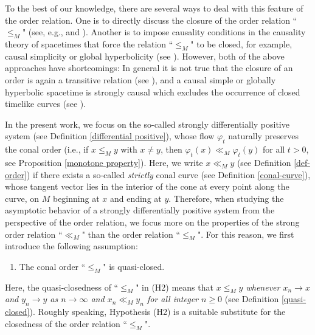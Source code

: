 \documentclass[a4paper,11pt]{article}
\theoremstyle{plain}
\theoremstyle{definition}
\numberwithin{equation}{section}
\begin{document}
To the best of our knowledge, there are several ways to deal with this feature of the order relation. One is to directly discuss the closure of the order relation ``$\leq_M$" (see, e.g., \cite[Section 7]{Lawson89} and \cite{Neeb91}). Another is to impose causality conditions in the causality theory of spacetimes that force the relation ``$\leq_M$" to be closed, for example, causal simplicity or global hyperbolicity (see \cite{Hawkingandellis73, Beemandehrlich81}).
However, both of the above approaches have shortcomings: In general it is not true that the closure of an order is again a transitive relation (see \cite[p.470]{Neeb91}), and 
a causal simple or globally hyperbolic spacetime is strongly causal which excludes the occurrence of closed timelike curves (see \cite[p.73]{Beemandehrlich81}).

In the present work, we focus on the so-called strongly differentially positive system (see Definition \ref{differential positive}), whose flow $\varphi_t$ naturally preserves the conal order (i.e., if $x\leq_M y$ with $x\neq y$, then $\varphi_t(x)\ll_M \varphi_t(y)$ for all $t>0$, see Proposition \ref{monotone property}). Here, we write $x\ll_M y$ (see Definition \ref{def-order}) if there exists a so-called \textit{strictly} conal curve (see Definition \ref{conal-curve}), whose tangent vector lies in the interior of the cone at every point along the curve, on $M$ beginning at $x$ and ending at $y$. Therefore, when studying the asymptotic behavior of a strongly differentially positive system from the perspective of the order relation, we focus more on the properties of the strong order relation ``$\ll_M$" than the order relation ``$\leq_M$". For this reason, we first introduce the following assumption:
\begin{enumerate}
	\item[{\bf (H2)}] The conal order ``$\leq_M$" is quasi-closed. 
\end{enumerate}
\noindent Here, the quasi-closedness of ``$\leq_M$" in (H2) means that {\it $x\leq_M y$ whenever $x_n\to x$ and $y_n\to y$ as $n\to \infty$ and $x_n\ll_M y_n$ for all integer $n\ge 0$} (see Definition \ref{quasi-closed}).
Roughly speaking, Hypothesis (H2) is a suitable substitute for the closedness of the order relation ``$\leq_M$". %
\end{document}
